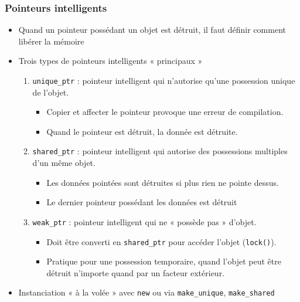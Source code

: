 \begin{frame}
\frametitle{Pointeurs intelligents}
\begin{itemize}[<+->]
\item Quand un pointeur possédant un objet est détruit, il faut définir comment libérer la mémoire
\item Trois types de pointeurs intelligents « principaux »
	\begin{enumerate}
	\item \texttt{unique\_ptr} : pointeur intelligent qui n'autorise qu'une possession unique de l'objet. 
		\begin{itemize}
		\item Copier et affecter le pointeur provoque une erreur de compilation.
		\item Quand le pointeur est détruit, la donnée est détruite.
		\end{itemize}
	\item \texttt{shared\_ptr} : pointeur intelligent qui autorise des possessions multiples d'un même objet.
		\begin{itemize}
		\item Les données pointées sont détruites si plus rien ne pointe dessus.
		\item Le dernier pointeur possédant les données est détruit
		\end{itemize}
	\item \texttt{weak\_ptr} : pointeur intelligent qui ne « possède pas » d'objet.
		\begin{itemize}
		\item Doit être converti en \texttt{shared\_ptr} pour accéder l'objet (\texttt{lock()}).
		\item Pratique pour une possession temporaire, quand l'objet peut être détruit n'importe quand par un facteur extérieur.
		\end{itemize}
	\end{enumerate}
\item Instanciation « à la volée » avec \lstinline|new| ou via \texttt{make\_unique}, \texttt{make\_shared}
\end{itemize}
\end{frame}

